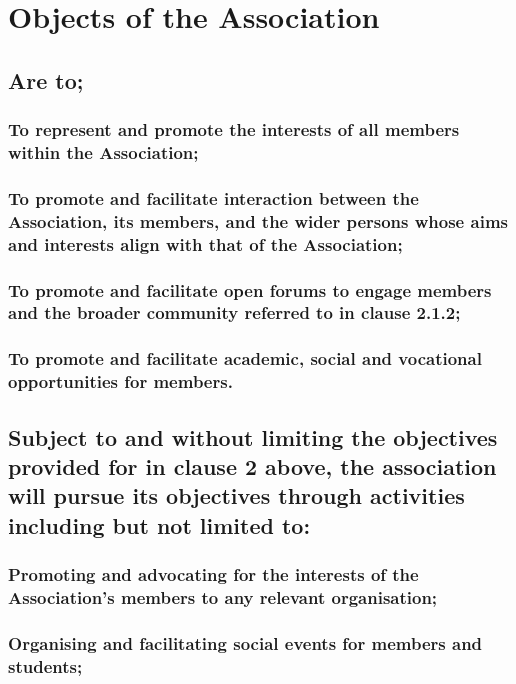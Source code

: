 \documentclass{article}
\newenvironment{subs}
  {\adjustwidth{2em}{0pt}}
  {\endadjustwidth}
\begin{document}
\section{Objects of the Association}
\begin{subs}
\subsection{Are to;}
\begin{subs}
\subsubsection{To represent and promote the interests of all members within the Association;}
\subsubsection{To promote and facilitate interaction between the Association, its members, and the wider persons whose aims and interests align with that of the Association;}
\subsubsection{To promote and facilitate open forums to engage members and the broader community referred to in clause 2.1.2;}
\subsubsection{To promote and facilitate academic, social and vocational opportunities for members.}
\end{subs}

\subsection{Subject to and without limiting the objectives provided for in clause 2 above, the association will pursue its objectives through activities including but not limited to:}

\begin{subs}
\subsubsection{Promoting and advocating for the interests of the Association's members to any relevant organisation;}
\subsubsection{Organising and facilitating social events for members and students;  }

\end{subs}
\end{subs}
\end{document}

